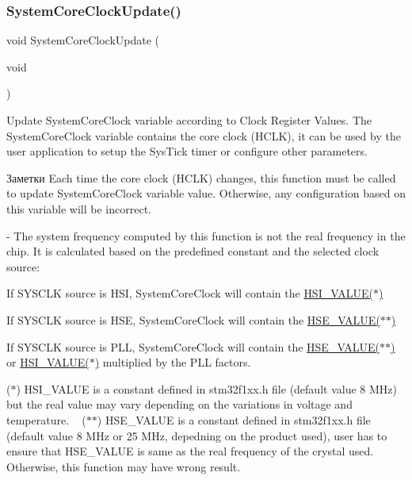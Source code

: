 \subsubsection{\texorpdfstring{SystemCoreClockUpdate()}{SystemCoreClockUpdate()}}
{\footnotesize\ttfamily void System\+Core\+Clock\+Update (\begin{DoxyParamCaption}\item[{void}]{ }\end{DoxyParamCaption})}



Update System\+Core\+Clock variable according to Clock Register Values. The System\+Core\+Clock variable contains the core clock (H\+C\+LK), it can be used by the user application to setup the Sys\+Tick timer or configure other parameters. 

\begin{DoxyNote}{Заметки}
Each time the core clock (H\+C\+LK) changes, this function must be called to update System\+Core\+Clock variable value. Otherwise, any configuration based on this variable will be incorrect. ~\newline
 

-\/ The system frequency computed by this function is not the real frequency in the chip. It is calculated based on the predefined constant and the selected clock source\+:
\end{DoxyNote}

\begin{DoxyItemize}
\item If S\+Y\+S\+C\+LK source is H\+SI, System\+Core\+Clock will contain the \mbox{\hyperlink{group___library__configuration__section_gaaa8c76e274d0f6dd2cefb5d0b17fbc37}{H\+S\+I\+\_\+\+V\+A\+L\+U\+E($\ast$)}}
\item If S\+Y\+S\+C\+LK source is H\+SE, System\+Core\+Clock will contain the \mbox{\hyperlink{group___library__configuration__section_gaeafcff4f57440c60e64812dddd13e7cb}{H\+S\+E\+\_\+\+V\+A\+L\+U\+E($\ast$$\ast$)}}
\item If S\+Y\+S\+C\+LK source is P\+LL, System\+Core\+Clock will contain the \mbox{\hyperlink{group___library__configuration__section_gaeafcff4f57440c60e64812dddd13e7cb}{H\+S\+E\+\_\+\+V\+A\+L\+U\+E($\ast$$\ast$)}} or \mbox{\hyperlink{group___library__configuration__section_gaaa8c76e274d0f6dd2cefb5d0b17fbc37}{H\+S\+I\+\_\+\+V\+A\+L\+U\+E($\ast$)}} multiplied by the P\+LL factors.
\end{DoxyItemize}

($\ast$) H\+S\+I\+\_\+\+V\+A\+L\+UE is a constant defined in stm32f1xx.\+h file (default value 8 M\+Hz) but the real value may vary depending on the variations in voltage and temperature. ~\newline
 ($\ast$$\ast$) H\+S\+E\+\_\+\+V\+A\+L\+UE is a constant defined in stm32f1xx.\+h file (default value 8 M\+Hz or 25 M\+Hz, depedning on the product used), user has to ensure that H\+S\+E\+\_\+\+V\+A\+L\+UE is same as the real frequency of the crystal used. Otherwise, this function may have wrong result.


